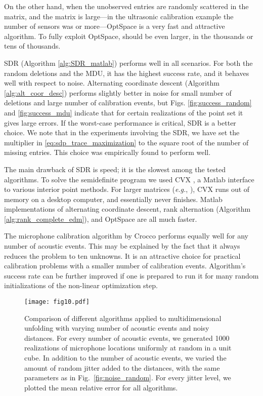 \documentclass[10pt,double]{IEEEtran}
\newcommand{\rev}[1]{{#1}}
\begin{document}
{On the other hand, when the unobserved entries are randomly scattered in the
matrix, and the matrix is large---in the ultrasonic calibration example the
number of sensors  was  or more---OptSpace is a very fast and
attractive algorithm. To fully exploit OptSpace,  should be even larger, in
the thousands or tens of thousands.

SDR (Algorithm \ref{alg:SDR_matlab}) performs well in all scenarios. For both
the random deletions and the MDU, it has the highest success rate, and it
behaves well with respect to noise. Alternating coordinate descent (Algorithm
\ref{alg:alt_coor_desc}) performs slightly better in noise for small number of
deletions and large number of calibration events, but Figs.
\ref{fig:success_random} and \ref{fig:success_mdu} indicate that for certain
realizations of the point set it gives large errors. If the worst-case
performance is critical, SDR is a better choice. We note that in the
experiments involving the SDR, we have set the multiplier  in
\ref{eq:sdp_trace_maximization} to the square root of the number of missing
entries. This choice was empirically found to perform well.

The main drawback of SDR is speed; it is the slowest among the tested
algorithms. To solve the semidefinite program we used CVX \cite{cvx,gb08}, a
Matlab interface to various interior point methods. For larger matrices
(\emph{e.g.}, ), CVX runs out of memory on a desktop computer, and
essentially never finishes. Matlab implementations of alternating coordinate
descent, rank alternation (Algorithm \ref{alg:rank_complete_edm}), and
OptSpace are all much faster.

The microphone calibration algorithm by Crocco \cite{Crocco:2012eu} performs
equally well for any number of acoustic events. This may be explained by the
fact that it always reduces the problem to ten unknowns. It is an attractive
choice for practical calibration problems with a smaller number of calibration
events. Algorithm's success rate can be further improved if one is prepared to
run it for many random initializations of the non-linear
optimization step.

\begin{figure}[t!]
\centering
\texttt{[image: fig10.pdf]}
\caption{\rev{Comparison of different algorithms applied to multidimensional
unfolding with varying number of acoustic events  and noisy distances. For
every number of acoustic events, we generated 1000 realizations of 
microphone locations uniformly at random in a unit cube. In addition to the
number of acoustic events, we varied the amount of random jitter added to the
distances, with the same parameters as in Fig.~\ref{fig:noise_random}. For
every jitter level, we plotted the mean relative error  for all algorithms.}}
\label{fig:noise_mdu}
\end{figure}

}
\end{document}
